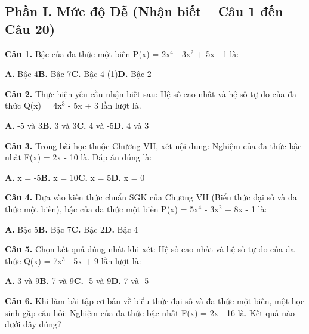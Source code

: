 \documentclass[11pt,a4paper]{article}
\begin{document}
\subsection*{\color{accent} Phần I. Mức độ Dễ (Nhận biết -- Câu 1 đến Câu 20)}
\textbf{\color{primary} Câu 1.} Bậc của đa thức một biến P(x) = 2x$^4$ - 3x$^2$ + 5x - 1 là:\par
\hspace*{1.5em}\textbf{A.} Bậc 4\quad\quad \textbf{B.} Bậc 7\quad\quad \textbf{C.} Bậc 4 (1)\quad\quad \textbf{D.} Bậc 2\par\vspace{2pt}
\textbf{\color{primary} Câu 2.} Thực hiện yêu cầu nhận biết sau: Hệ số cao nhất và hệ số tự do của đa thức Q(x) = 4x$^3$ - 5x + 3 lần lượt là.\par
\hspace*{1.5em}\textbf{A.} -5 và 3\quad\quad \textbf{B.} 3 và 3\quad\quad \textbf{C.} 4 và -5\quad\quad \textbf{D.} 4 và 3\par\vspace{2pt}
\textbf{\color{primary} Câu 3.} Trong bài học thuộc Chương VII, xét nội dung: Nghiệm của đa thức bậc nhất F(x) = 2x - 10 là. Đáp án đúng là:\par
\hspace*{1.5em}\textbf{A.} x = -5\quad\quad \textbf{B.} x = 10\quad\quad \textbf{C.} x = 5\quad\quad \textbf{D.} x = 0\par\vspace{2pt}
\textbf{\color{primary} Câu 4.} Dựa vào kiến thức chuẩn SGK của Chương VII (Biểu thức đại số và đa thức một biến), bậc của đa thức một biến P(x) = 5x$^4$ - 3x$^2$ + 8x - 1 là:\par
\hspace*{1.5em}\textbf{A.} Bậc 5\quad\quad \textbf{B.} Bậc 7\quad\quad \textbf{C.} Bậc 2\quad\quad \textbf{D.} Bậc 4\par\vspace{2pt}
\textbf{\color{primary} Câu 5.} Chọn kết quả đúng nhất khi xét: Hệ số cao nhất và hệ số tự do của đa thức Q(x) = 7x$^3$ - 5x + 9 lần lượt là:\par
\hspace*{1.5em}\textbf{A.} 3 và 9\quad\quad \textbf{B.} 7 và 9\quad\quad \textbf{C.} -5 và 9\quad\quad \textbf{D.} 7 và -5\par\vspace{2pt}
\textbf{\color{primary} Câu 6.} Khi làm bài tập cơ bản về biểu thức đại số và đa thức một biến, một học sinh gặp câu hỏi: Nghiệm của đa thức bậc nhất F(x) = 2x - 16 là. Kết quả nào dưới đây đúng?\par
\end{document}
